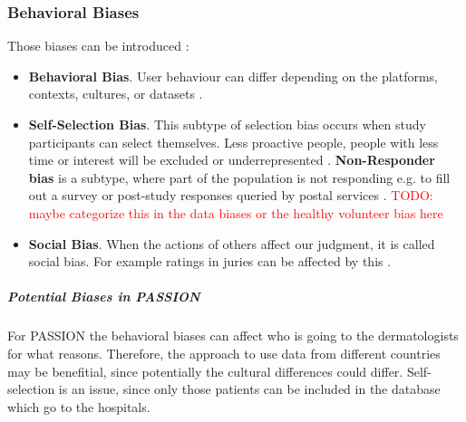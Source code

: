 \documentclass[12pt, a4paper, oneside]{book}   	%
\renewcommand{\todo}[1]{\textcolor{red}{TODO: #1}}
\renewcommand{\paragraph}[1]{%
	\subsubsection*{#1}%
}
\begin{document}
			\paragraph{Behavioral Biases}
			
			Those biases can be introduced :
			\begin{itemize}
				\item \textbf{Behavioral Bias}. User behaviour can differ depending on the platforms, contexts, cultures, or datasets \autocite{M120_Olteanu_2019}.
				\item \textbf{Self-Selection Bias}. This subtype of selection bias occurs when study participants can select themselves. Less proactive people, people with less time or interest will be excluded or underrepresented \autocites{Mester_2022}{Mehrabi_2021}. \textbf{Non-Responder bias} is a subtype, where part of the population is not responding e.g. to fill out a survey or post-study responses queried by postal services \autocite{Chakraborty_2024}. \todo{maybe categorize this in the data biases or the healthy volunteer bias here}
				\item \textbf{Social Bias}. When the actions of others affect our judgment, it is called social bias. For example ratings in juries can be affected by this \autocite{M9_Baeza-Yates_2018}.
			\end{itemize}
			
			
			\subparagraph{Potential Biases in PASSION}
			For PASSION the behavioral biases can affect who is going to the dermatologists for what reasons. Therefore, the approach to use data from different countries may be benefitial, since potentially the cultural differences could differ.
			Self-selection is an issue, since only those patients can be included in the database which go to the hospitals.
			
			
			
\end{document}

